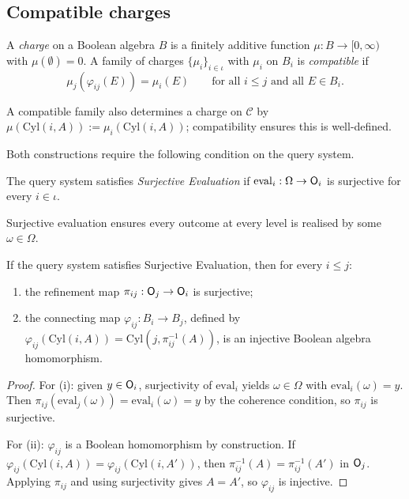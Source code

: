 \subsection{Compatible charges}

\begin{definition}
A \emph{charge} on a Boolean algebra $B$ is a finitely additive function $\mu : B \to [0, \infty)$ with $\mu(\emptyset) = 0$.  A family of charges $\{\mu_i\}_{i \in \iota}$ with $\mu_i$ on $B_i$ is \emph{compatible} if
\[
  \mu_j(\varphi_{ij}(E)) = \mu_i(E)
  \qquad \text{for all } i \leq j \text{ and all } E \in B_i.
\]
\end{definition}

\noindent A compatible family also determines a charge on $\mathcal{C}$ by
$\mu(\mathrm{Cyl}(i, A)) := \mu_i(\mathrm{Cyl}(i, A))$; compatibility ensures this is well-defined.

Both constructions require the following condition on the query system.

\begin{definition}
\label{def:eval-surjective}
The query system satisfies \emph{Surjective Evaluation} if $\mathrm{eval}_i : \Omega \to \mathsf{O}_{i}$ is surjective for every $i \in \iota$.
\end{definition}

\noindent Surjective evaluation ensures every outcome at every level is realised by some $\omega \in \Omega$.

\begin{lemma}
\label{lem:surj-inj}
If the query system satisfies Surjective Evaluation, then for every $i \leq j$:
\begin{enumerate}[label=(\roman*)]
  \item the refinement map $\pi_{ij} : \mathsf{O}_{j} \to \mathsf{O}_{i}$ is surjective;
  \item the connecting map $\varphi_{ij} : B_i \to B_j$, defined by $\varphi_{ij}(\mathrm{Cyl}(i,A)) = \mathrm{Cyl}(j, \pi_{ij}^{-1}(A))$, is an injective Boolean algebra homomorphism.
\end{enumerate}
\end{lemma}

\begin{proof}
For (i): given $y \in \mathsf{O}_{i}$, surjectivity of $\mathrm{eval}_i$ yields $\omega \in \Omega$ with $\mathrm{eval}_i(\omega) = y$. Then $\pi_{ij}(\mathrm{eval}_j(\omega)) = \mathrm{eval}_i(\omega) = y$ by the coherence condition, so $\pi_{ij}$ is surjective.

For (ii): $\varphi_{ij}$ is a Boolean homomorphism by construction. If $\varphi_{ij}(\mathrm{Cyl}(i,A)) = \varphi_{ij}(\mathrm{Cyl}(i,A'))$, then $\pi_{ij}^{-1}(A) = \pi_{ij}^{-1}(A')$ in $\mathsf{O}_{j}$. Applying $\pi_{ij}$ and using surjectivity gives $A = A'$, so $\varphi_{ij}$ is injective.
\end{proof}


